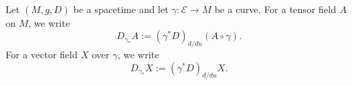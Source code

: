 Let $(M, g, D)$ be a spacetime and let $\gamma: \mathcal{E} \rightarrow M$ be a curve. For a tensor field $A$ on $M$, we write
$$D_{\gamma_*} A := (\gamma^* D)_{d/du} (A \circ \gamma).$$
For a vector field $X$ over $\gamma$, we write
$$D_{\gamma_*} X := (\gamma^* D)_{d/du} X.$$
